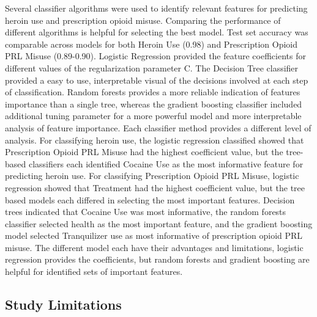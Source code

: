 \documentclass[sigconf]{acmart}
\begin{document}
Several classifier algorithms were used to identify relevant features for 
predicting heroin use and prescription opioid misuse. Comparing the performance 
of different algorithms is helpful for  selecting the best model. Test set
accuracy was comparable across models for both Heroin Use (0.98) and 
Prescription Opioid PRL Misuse (0.89-0.90). Logistic Regression provided the
feature coefficients for different values of the regularization parameter C. 
The Decision Tree classifier provided a easy to use, interpretable visual of
the decisions involved at each step of classification. Random forests provides
a more reliable indication of features importance than a single tree, 
whereas the gradient boosting classifier included additional tuning 
parameter for a more powerful model and more interpretable analysis of
feature importance. Each classifier method provides a different level of
analysis. For classifying heroin use, the logistic regression classified
showed that Prescription Opioid PRL Misuse had the highest coefficient value, 
but the tree-based classifiers each identified Cocaine Use as the most
informative feature for predicting heroin use. For classifying Prescription 
Opioid PRL Misuse, logistic regression showed that Treatment had the highest
coefficient value, but the tree based models each differed in selecting the
most important features. Decision trees indicated that Cocaine Use was most
informative, the random forests classifier selected health as the most
important feature, and the gradient boosting model selected Tranquilizer use
as most informative of prescription opioid PRL misuse. The different model 
each have their advantages and limitations, logistic regression provides the
coefficients, but random forests and gradient boosting are helpful for 
identified sets of important features.

\subsection{Study Limitations}
\end{document}
